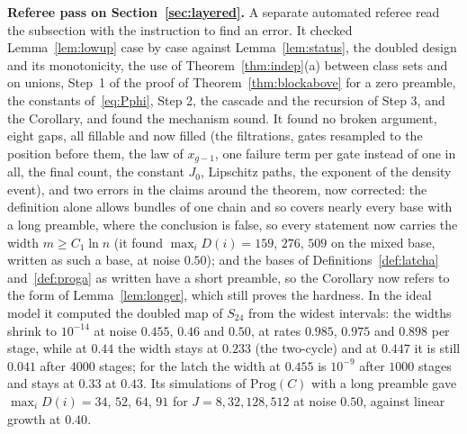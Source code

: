 \documentclass[11pt]{amsart}
\theoremstyle{definition}
\theoremstyle{remark}
\begin{document}
\medskip\noindent\textbf{Referee pass on Section~\ref{sec:layered}.} A separate automated referee
read the subsection with the instruction to find an error. It checked Lemma~\ref{lem:lowup} case by
case against Lemma~\ref{lem:status}, the doubled design and its monotonicity, the use of
Theorem~\ref{thm:indep}(a) between class sets and on unions, Step~1 of the proof of
Theorem~\ref{thm:blockabove} for a zero preamble, the constants of~\eqref{eq:Pphi}, Step 2, the
cascade and the recursion of Step 3, and the Corollary, and found the mechanism sound. It found no
broken argument, eight gaps, all fillable and now filled (the filtrations, gates resampled to the
position before them, the law of $x_{g-1}$, one failure term per gate instead of one in all, the
final count, the constant $J_0$, Lipschitz paths, the exponent of the density event), and two
errors in the claims around the theorem, now corrected: the definition alone allows bundles of one
chain and so covers nearly every base with a long preamble, where the conclusion is false, so
every statement now carries the width $m\ge C_1\ln n$ (it found $\max_iD(i)=159$, $276$, $509$ on
the mixed base, written as such a base, at noise $0.50$); and the bases of
Definitions~\ref{def:latcha} and~\ref{def:proga} as written have a short preamble, so the
Corollary now refers to the form of Lemma~\ref{lem:longer}, which still proves the hardness. In the
ideal model it computed the doubled map of $S_{24}$ from the widest intervals: the widths shrink
to $10^{-14}$ at noise $0.455$, $0.46$ and $0.50$, at rates $0.985$, $0.975$ and $0.898$ per stage,
while at $0.44$ the width stays at $0.233$ (the two-cycle) and at $0.447$ it is still $0.041$ after
$4000$ stages; for the latch the width at $0.455$ is $10^{-9}$ after $1000$ stages and stays at
$0.33$ at $0.43$. Its simulations of $\mathrm{Prog}(C)$ with a long preamble gave $\max_iD(i)=34$,
$52$, $64$, $91$ for $J=8,32,128,512$ at noise $0.50$, against linear growth at $0.40$.
\end{document}
